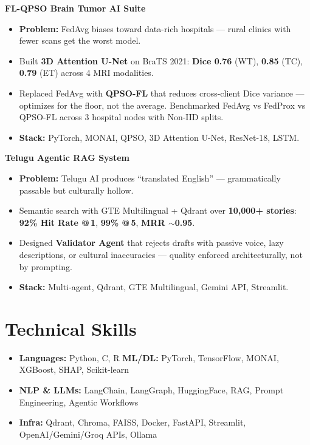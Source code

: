 \documentclass[letterpaper,10pt]{article}
\newcommand{\projectheading}[3]{%
  \noindent\textbf{#1}\hfill{\small #2\quad#3}%
}
\begin{document}
\projectheading{FL-QPSO Brain Tumor AI Suite}%
{\href{https://github.com/DIVYANSH-TEJA-09/BrainTumor-FL-Pipeline}{\faGithub}}%
{\href{https://huggingface.co/spaces/Divs0910/Brain-Tumor-AI-Suite}{\faExternalLink*}}
\begin{itemize}[leftmargin=0.2in, itemsep=0pt, topsep=2pt, parsep=0pt]
\item \textbf{Problem:} FedAvg biases toward data-rich hospitals — rural clinics with fewer scans get the worst model.
\item Built \textbf{3D Attention U-Net} on BraTS 2021: \textbf{Dice 0.76} (WT), \textbf{0.85} (TC), \textbf{0.79} (ET) across 4 MRI modalities.
\item Replaced FedAvg with \textbf{QPSO-FL} that reduces cross-client Dice variance — optimizes for the floor, not the average. Benchmarked FedAvg vs FedProx vs QPSO-FL across 3 hospital nodes with Non-IID splits.
\item \textbf{Stack:} PyTorch, MONAI, QPSO, 3D Attention U-Net, ResNet-18, LSTM.
\end{itemize}
\vspace{2pt}

\projectheading{Telugu Agentic RAG System}%
{\href{https://github.com/DIVYANSH-TEJA-09/telugu-agentic-rag}{\faGithub}}%
{\href{https://telugu-story-generator-agent.streamlit.app}{\faExternalLink*}}
\begin{itemize}[leftmargin=0.2in, itemsep=0pt, topsep=2pt, parsep=0pt]
\item \textbf{Problem:} Telugu AI produces ``translated English'' — grammatically passable but culturally hollow.
\item Semantic search with GTE Multilingual + Qdrant over \textbf{10,000+ stories}: \textbf{92\% Hit Rate @\,1}, \textbf{99\% @\,5}, \textbf{MRR $\sim$0.95}.
\item Designed \textbf{Validator Agent} that rejects drafts with passive voice, lazy descriptions, or cultural inaccuracies — quality enforced architecturally, not by prompting.
\item \textbf{Stack:} Multi-agent, Qdrant, GTE Multilingual, Gemini API, Streamlit.
\end{itemize}

\section{Technical Skills}
\vspace{1pt}
\begin{itemize}[leftmargin=0.2in, itemsep=0pt, topsep=0pt, parsep=0pt]
\item \textbf{Languages:} Python, C, R \quad \textbf{ML/DL:} PyTorch, TensorFlow, MONAI, XGBoost, SHAP, Scikit-learn
\item \textbf{NLP \& LLMs:} LangChain, LangGraph, HuggingFace, RAG, Prompt Engineering, Agentic Workflows
\item \textbf{Infra:} Qdrant, Chroma, FAISS, Docker, FastAPI, Streamlit, OpenAI/Gemini/Groq APIs, Ollama
\end{itemize}
\end{document}
